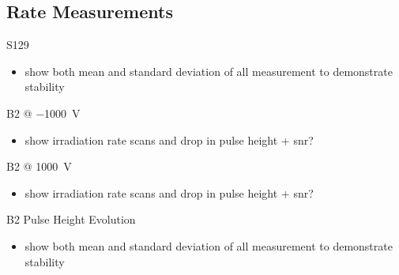 \subsection{Rate Measurements}
\begin{frame}{S129}

	
	\begin{itemize}\itemfill
		\item show both mean and standard deviation of all measurement to demonstrate stability
	\end{itemize}

\end{frame}
\begin{frame}{B2 @ \SI{-1000}{\volt}}

	\begin{minipage}{.3\textwidth}
		\begin{itemize}\itemfill
			\item show irradiation rate scans and drop in pulse height + snr?
		\end{itemize}
	\end{minipage}\hfill
	\begin{minipage}{.67\textwidth}
	\end{minipage}
	
\end{frame}
\begin{frame}{B2 @ \SI[retain-explicit-plus]{+1000}{\volt}}

	\begin{minipage}{.3\textwidth}
		\begin{itemize}\itemfill
			\item show irradiation rate scans and drop in pulse height + snr?
		\end{itemize}
	\end{minipage}\hfill
	\begin{minipage}{.67\textwidth}
	\end{minipage}
	
\end{frame}
\begin{frame}{B2 Pulse Height Evolution}


	\begin{itemize}\itemfill
		\item show both mean and standard deviation of all measurement to demonstrate stability
	\end{itemize}

\end{frame}
